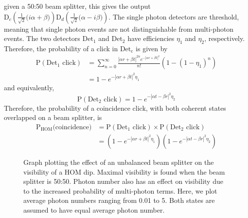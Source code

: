 given a 50:50 beam splitter, this gives the output $\text{D}_c(\frac{1}{\sqrt{2}}\big(i\alpha + \beta\big))\text{D}_d(\frac{1}{\sqrt{2}}\big(\alpha - i\beta\big))$. The single photon detectors are threshold, meaning that single photon events are not distinguishable from multi-photon events. The two detectors $\text{Det}_1$ and $\text{Det}_2$ have efficiencies $\eta_1$ and $\eta_2$, respectively. Therefore, the probability of a click in $\text{Det}_\text{c}$ is given by
\begin{align}
	\text{P}(\text{Det}_1 \text{ click}) &= \sum_{n=0}^\infty \frac{|\alpha r + \beta t|^{2n} e^{-|\alpha r + \beta t|^2}}{n!}(1-(1-\eta_1)^n)\\
	&= 1 - e^{-|\alpha r + \beta t|^2 \eta_1}
\end{align}
and equivalently,
\begin{equation}
	\text{P}(\text{Det}_2 \text{ click}) = 1 - e^{-|\alpha t - \beta r|^2 \eta_2}
\end{equation}
Therefore, the probability of a coincidence click, with both coherent states overlapped on a beam splitter, is
\begin{align}
	\text{P}_\text{HOM}\text{(coincidence)} &= \text{P}(\text{Det}_1 \text{ click}) \times \text{P}(\text{Det}_2 \text{ click})\\
	&= \left(1 - e^{-|\alpha r + \beta t|^2 \eta_1}\right)\left(1 - e^{-|\alpha t - \beta r|^2 \eta_2}\right)
\end{align}

\begin{figure}[tbp]
	\caption[Coherent state photon number visibility]{Graph plotting the effect of an unbalanced beam splitter on the visibility of a HOM dip. Maximal visibility is found when the beam splitter is 50:50. Photon number also has an effect on visibility due to the increased probability of multi-photon terms. Here, we plot average photon numbers ranging from 0.01 to 5. Both states are assumed to have equal average photon number.}
	\label{fig:HOM_BS_Vis}
\end{figure}

